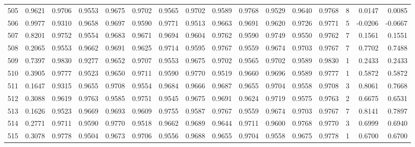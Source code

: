 \begin{tabular}{lrrrrrrrrrrrrrrr}
505 &      0.9621 &  0.9706 &  0.9553 &  0.9675 &  0.9702 &  0.9565 &  0.9702 &  0.9589 &  0.9768 &  0.9529 &   0.9640 &     0.9768 &      8 &                    0.0147 &                     0.0085 \\
506 &      0.9977 &  0.9310 &  0.9658 &  0.9697 &  0.9590 &  0.9771 &  0.9513 &  0.9663 &  0.9691 &  0.9620 &   0.9726 &     0.9771 &      5 &                   -0.0206 &                    -0.0667 \\
507 &      0.8201 &  0.9752 &  0.9554 &  0.9683 &  0.9671 &  0.9694 &  0.9604 &  0.9762 &  0.9590 &  0.9749 &   0.9550 &     0.9762 &      7 &                    0.1561 &                     0.1551 \\
508 &      0.2065 &  0.9553 &  0.9662 &  0.9691 &  0.9625 &  0.9714 &  0.9595 &  0.9767 &  0.9559 &  0.9674 &   0.9703 &     0.9767 &      7 &                    0.7702 &                     0.7488 \\
509 &      0.7397 &  0.9830 &  0.9277 &  0.9652 &  0.9707 &  0.9553 &  0.9675 &  0.9702 &  0.9565 &  0.9702 &   0.9589 &     0.9830 &      1 &                    0.2433 &                     0.2433 \\
510 &      0.3905 &  0.9777 &  0.9523 &  0.9650 &  0.9711 &  0.9590 &  0.9770 &  0.9519 &  0.9660 &  0.9696 &   0.9589 &     0.9777 &      1 &                    0.5872 &                     0.5872 \\
511 &      0.1647 &  0.9315 &  0.9655 &  0.9708 &  0.9554 &  0.9684 &  0.9666 &  0.9687 &  0.9655 &  0.9704 &   0.9558 &     0.9708 &      3 &                    0.8061 &                     0.7668 \\
512 &      0.3088 &  0.9619 &  0.9763 &  0.9585 &  0.9751 &  0.9545 &  0.9675 &  0.9691 &  0.9624 &  0.9719 &   0.9575 &     0.9763 &      2 &                    0.6675 &                     0.6531 \\
513 &      0.1626 &  0.9523 &  0.9669 &  0.9693 &  0.9609 &  0.9755 &  0.9587 &  0.9767 &  0.9559 &  0.9674 &   0.9703 &     0.9767 &      7 &                    0.8141 &                     0.7897 \\
514 &      0.2771 &  0.9711 &  0.9590 &  0.9770 &  0.9518 &  0.9662 &  0.9689 &  0.9644 &  0.9711 &  0.9600 &   0.9768 &     0.9770 &      3 &                    0.6999 &                     0.6940 \\
515 &      0.3078 &  0.9778 &  0.9504 &  0.9673 &  0.9706 &  0.9556 &  0.9688 &  0.9655 &  0.9704 &  0.9558 &   0.9675 &     0.9778 &      1 &                    0.6700 &                     0.6700 \\

\end{tabular}
